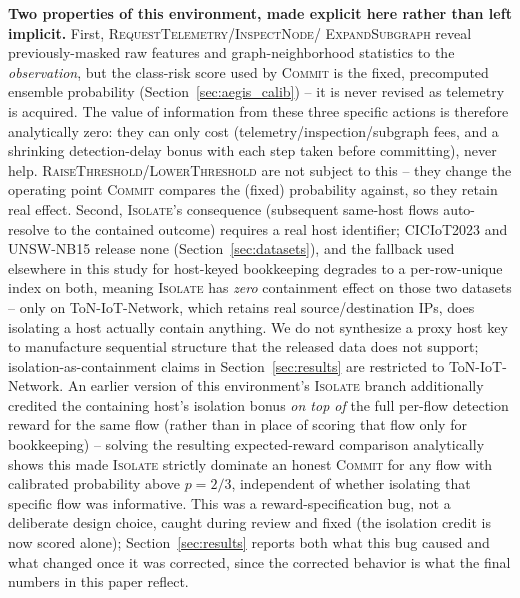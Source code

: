 \documentclass[journal]{IEEEtran}
\begin{document}
\textbf{Two properties of this environment, made explicit here rather than
left implicit.} First, \textsc{RequestTelemetry}/\textsc{InspectNode}/
\textsc{ExpandSubgraph} reveal previously-masked raw features and
graph-neighborhood statistics to the \emph{observation}, but the class-risk
score used by \textsc{Commit} is the fixed, precomputed ensemble probability
(Section~\ref{sec:aegis_calib}) -- it is never revised as telemetry is
acquired. The value of information from these three specific actions is
therefore analytically zero: they can only cost (telemetry/inspection/subgraph
fees, and a shrinking detection-delay bonus with each step taken before
committing), never help. \textsc{RaiseThreshold}/\textsc{LowerThreshold} are
not subject to this -- they change the operating point \textsc{Commit}
compares the (fixed) probability against, so they retain real effect. Second,
\textsc{Isolate}'s consequence (subsequent same-host flows auto-resolve to
the contained outcome) requires a real host identifier; CICIoT2023 and
UNSW-NB15 release none (Section~\ref{sec:datasets}), and the fallback used
elsewhere in this study for host-keyed bookkeeping degrades to a
per-row-unique index on both, meaning \textsc{Isolate} has \emph{zero}
containment effect on those two datasets -- only on ToN-IoT-Network, which
retains real source/destination IPs, does isolating a host actually contain
anything. We do not synthesize a proxy host key to manufacture sequential
structure that the released data does not support; isolation-as-containment
claims in Section~\ref{sec:results} are restricted to ToN-IoT-Network. An
earlier version of this environment's \textsc{Isolate} branch additionally
credited the containing host's isolation bonus \emph{on top of} the full
per-flow detection reward for the same flow (rather than in place of scoring
that flow only for bookkeeping) -- solving the resulting expected-reward
comparison analytically shows this made \textsc{Isolate} strictly dominate an
honest \textsc{Commit} for any flow with calibrated probability above
$p{=}2/3$, independent of whether isolating that specific flow was
informative. This was a reward-specification bug, not a deliberate design
choice, caught during review and fixed (the isolation credit is now scored
alone); Section~\ref{sec:results} reports both what this bug caused and what
changed once it was corrected, since the corrected behavior is what the
final numbers in this paper reflect.


\end{document}
